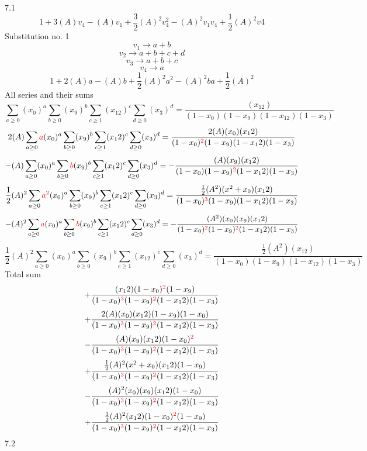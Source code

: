 \documentclass{article}
\begin{document}
                
7.1
\[1+3(A)v_4-(A)v_1+\frac{3}{2}(A)^2v_4^{2}-(A)^2v_1v_4+\frac{1}{2}(A)^2v4\]Substitution no. 1\[v_1\rightarrow{a+b}\]\[v_2\rightarrow{a+b+c+d}\]\[v_3\rightarrow{a+b+c}\]\[v_4\rightarrow{a}\]\[1+2(A)a-(A)b+\frac{1}{2}(A)^2a^{2}-(A)^2ba+\frac{1}{2}(A)^2\]All series and their sums\[\sum_{a\geq{0}}(x_0)^{a}\sum_{b\geq{0}}(x_9)^{b}\sum_{c\geq{1}}(x_12)^{c}\sum_{d\geq{0}}(x_3)^{d}=\frac{(x_12)}{(1-x_0)(1-x_9)(1-x_12)(1-x_3)}\]\[2(A)\sum_{a\geq{0}}\textcolor{red}{a}(x_0)^{a}\sum_{b\geq{0}}(x_9)^{b}\sum_{c\geq{1}}(x_12)^{c}\sum_{d\geq{0}}(x_3)^{d}=\frac{2(A)(x_0)(x_12)}{(1-x_0)^{\textcolor{red}{2}}(1-x_9)(1-x_12)(1-x_3)}\]\[-(A)\sum_{a\geq{0}}(x_0)^{a}\sum_{b\geq{0}}\textcolor{red}{b}(x_9)^{b}\sum_{c\geq{1}}(x_12)^{c}\sum_{d\geq{0}}(x_3)^{d}=-\frac{(A)(x_9)(x_12)}{(1-x_0)(1-x_9)^{\textcolor{red}{2}}(1-x_12)(1-x_3)}\]\[\frac{1}{2}(A)^{2}\sum_{a\geq{0}}\textcolor{red}{a^{2}}(x_0)^{a}\sum_{b\geq{0}}(x_9)^{b}\sum_{c\geq{1}}(x_12)^{c}\sum_{d\geq{0}}(x_3)^{d}=\frac{\frac{1}{2}(A^{2})(x^{2}+x_0)(x_12)}{(1-x_0)^{\textcolor{red}{3}}(1-x_9)(1-x_12)(1-x_3)}\]\[-(A)^{2}\sum_{a\geq{0}}\textcolor{red}{a}(x_0)^{a}\sum_{b\geq{0}}\textcolor{red}{b}(x_9)^{b}\sum_{c\geq{1}}(x_12)^{c}\sum_{d\geq{0}}(x_3)^{d}=-\frac{(A^{2})(x_0)(x_9)(x_12)}{(1-x_0)^{\textcolor{red}{2}}(1-x_9)^{\textcolor{red}{2}}(1-x_12)(1-x_3)}\]\[\frac{1}{2}(A)^{2}\sum_{a\geq{0}}(x_0)^{a}\sum_{b\geq{0}}(x_9)^{b}\sum_{c\geq{1}}(x_12)^{c}\sum_{d\geq{0}}(x_3)^{d}=\frac{\frac{1}{2}(A^{2})(x_12)}{(1-x_0)(1-x_9)(1-x_12)(1-x_3)}\]
Total sum
\[+\frac{(x_12)(1-x_0)^{\textcolor{red}{2}}(1-x_9)}{(1-x_0)^{\textcolor{red}{3}}(1-x_9)^{\textcolor{red}{2}}(1-x_12)(1-x_3)}\]\[+\frac{2(A)(x_0)(x_12)(1-x_9)(1-x_0)}{(1-x_0)^{\textcolor{red}{3}}(1-x_9)^{\textcolor{red}{2}}(1-x_12)(1-x_3)}\]\[-\frac{(A)(x_9)(x_12)(1-x_0)^{\textcolor{red}{2}}}{(1-x_0)^{\textcolor{red}{3}}(1-x_9)^{\textcolor{red}{2}}(1-x_12)(1-x_3)}\]\[+\frac{\frac{1}{2}(A)^{2}(x^{2}+x_0)(x_12)(1-x_9)}{(1-x_0)^{\textcolor{red}{3}}(1-x_9)^{\textcolor{red}{2}}(1-x_12)(1-x_3)}\]\[-\frac{(A)^{2}(x_0)(x_9)(x_12)(1-x_0)}{(1-x_0)^{\textcolor{red}{3}}(1-x_9)^{\textcolor{red}{2}}(1-x_12)(1-x_3)}\]\[+\frac{\frac{1}{2}(A)^{2}(x_12)(1-x_0)^{\textcolor{red}{2}}(1-x_9)}{(1-x_0)^{\textcolor{red}{3}}(1-x_9)^{\textcolor{red}{2}}(1-x_12)(1-x_3)}\]
7.2
\end{document}
